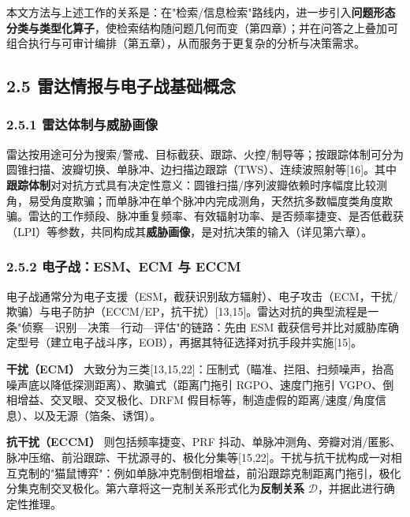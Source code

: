 \documentclass[12pt,a4paper]{ctexart}
\begin{document}
本文方法与上述工作的关系是：在"检索/信息检索"路线内，进一步引入\textbf{问题形态分类与类型化算子}，使检索结构随问题几何而变（第四章）；并在问答之上叠加可组合执行与可审计编排（第五章），从而服务于更复杂的分析与决策需求。

\subsection*{2.5 雷达情报与电子战基础概念}

\subsubsection*{2.5.1 雷达体制与威胁画像}

雷达按用途可分为搜索/警戒、目标截获、跟踪、火控/制导等；按跟踪体制可分为圆锥扫描、波瓣切换、单脉冲、边扫描边跟踪（TWS）、连续波照射等[16]。其中\textbf{跟踪体制}对对抗方式具有决定性意义：圆锥扫描/序列波瓣依赖时序幅度比较测角，易受角度欺骗；而单脉冲在单个脉冲内完成测角，天然抗多数幅度类角度欺骗。雷达的工作频段、脉冲重复频率、有效辐射功率、是否频率捷变、是否低截获（LPI）等参数，共同构成其\textbf{威胁画像}，是对抗决策的输入（详见第六章）。

\subsubsection*{2.5.2 电子战：ESM、ECM 与 ECCM}

电子战通常分为电子支援（ESM，截获识别敌方辐射）、电子攻击（ECM，干扰/欺骗）与电子防护（ECCM/EP，抗干扰）[13,15]。雷达对抗的典型流程是一条"侦察—识别—决策—行动—评估"的链路：先由 ESM 截获信号并比对威胁库确定型号（建立电子战斗序，EOB），再据其特征选择对抗手段并实施[15]。

\textbf{干扰（ECM）} 大致分为三类[13,15,22]：压制式（瞄准、拦阻、扫频噪声，抬高噪声底以降低探测距离）、欺骗式（距离门拖引 RGPO、速度门拖引 VGPO、倒相增益、交叉眼、交叉极化、DRFM 假目标等，制造虚假的距离/速度/角度信息）、以及无源（箔条、诱饵）。

\textbf{抗干扰（ECCM）} 则包括频率捷变、PRF 抖动、单脉冲测角、旁瓣对消/匿影、脉冲压缩、前沿跟踪、干扰源寻的、极化分集等[15,22]。干扰与抗干扰构成一对相互克制的"猫鼠博弈"：例如单脉冲克制倒相增益，前沿跟踪克制距离门拖引，极化分集克制交叉极化。第六章将这一克制关系形式化为\textbf{反制关系} $\mathcal{D}$，并据此进行确定性推理。
\end{document}
